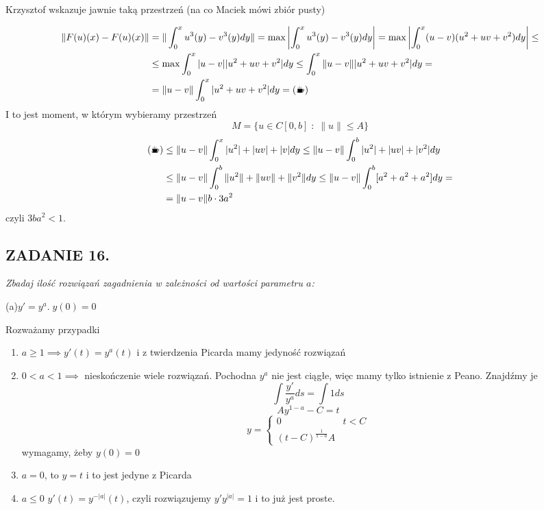 \documentclass{article}
\begin{document}
Krzysztof wskazuje jawnie taką przestrzeń (na co Maciek mówi zbiór pusty)

\begin{align*}
    \|F(u)(x)-F(u)(x)\|&=\|\int_0^xu^3(y)-v^3(y)dy\|=\max\left|\int_0^xu^3(y)-v^3(y)dy\right|=\max\left|\int_0^x(u-v)(u^2+uv+v^2)dy\right|\leq\\
    &\leq\max\int_0^x|u-v||u^2+uv+v^2|dy\leq\int_0^x\|u-v\||u^2+uv+v^2|dy=\\
    &=\|u-v\|\int_0^x|u^2+uv+v^2|dy=(\text{\Coffeecup})
\end{align*}
I to jest moment, w którym wybieramy przestrzeń
$$M=\{u\in C[0,b]\;:\;\|u\|\leq A\}$$
\begin{align*}
(\text{\Coffeecup})&\leq\|u-v\|\int_0^x|u^2|+|uv|+|v|dy\leq\|u-v\|\int_0^b|u^2|+|uv|+|v^2|dy\\
&\leq\|u-v\|\int_0^b\|u^2\|+\|uv\|+\|v^2\|dy\leq \|u-v\|\int_0^b[a^2+a^2+a^2]dy=\\
&=\|u-v\|b\cdot3a^2
\end{align*}
czyli $3ba^2<1$.

\subsection*{ZADANIE 16.}
{\slshape\color{purple}Zbadaj ilość rozwiązań zagadnienia w zależności od wartości parametru $a$:

(a)$y'=y^a.\;y(0)=0$
}

Rozważamy przypadki
\begin{enumerate}
    \item $a\geq 1\implies y'(t)=y^a(t)$ i z twierdzenia Picarda mamy jedyność rozwiązań
    \item $0<a<1\implies$ nieskończenie wiele rozwiązań. Pochodna $y^a$ nie jest ciągłe, więc mamy tylko istnienie z Peano. Znajdźmy je
    $$\int\frac{y'}{y^a}ds=\int 1ds$$
    $$Ay^{1-a}-C=t$$
    $$y=\begin{cases}0&t<C\\(t-C)^{\frac{1}{1-a}}A\end{cases}$$
    wymagamy, żeby $y(0)=0$
    \item $a=0$, to $y=t$ i to jest jedyne z Picarda
    \item $a\leq 0$ $y'(t)=y^{-|a|}(t)$, czyli rozwiązujemy $y'y^{|a|}=1$ i to już jest proste. 
\end{enumerate}
\end{document}
